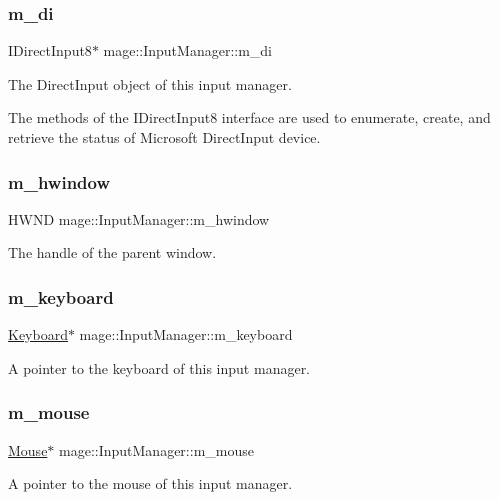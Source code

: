 \subsubsection{\texorpdfstring{m\+\_\+di}{m\_di}}
{\footnotesize\ttfamily I\+Direct\+Input8$\ast$ mage\+::\+Input\+Manager\+::m\+\_\+di\hspace{0.3cm}{\ttfamily [protected]}}

The Direct\+Input object of this input manager.

The methods of the I\+Direct\+Input8 interface are used to enumerate, create, and retrieve the status of Microsoft Direct\+Input device. \hypertarget{classmage_1_1_input_manager_a07a1d3a593bc497c747c6d2e4605a229}{}\label{classmage_1_1_input_manager_a07a1d3a593bc497c747c6d2e4605a229} 
\subsubsection{\texorpdfstring{m\+\_\+hwindow}{m\_hwindow}}
{\footnotesize\ttfamily H\+W\+ND mage\+::\+Input\+Manager\+::m\+\_\+hwindow\hspace{0.3cm}{\ttfamily [protected]}}

The handle of the parent window. \hypertarget{classmage_1_1_input_manager_a04251723b39860d1436295ca74d5e997}{}\label{classmage_1_1_input_manager_a04251723b39860d1436295ca74d5e997} 
\subsubsection{\texorpdfstring{m\+\_\+keyboard}{m\_keyboard}}
{\footnotesize\ttfamily \hyperlink{classmage_1_1_keyboard}{Keyboard}$\ast$ mage\+::\+Input\+Manager\+::m\+\_\+keyboard\hspace{0.3cm}{\ttfamily [protected]}}

A pointer to the keyboard of this input manager. \hypertarget{classmage_1_1_input_manager_a41f41c1c021cc6dae422cb9abe7b8f87}{}\label{classmage_1_1_input_manager_a41f41c1c021cc6dae422cb9abe7b8f87} 
\subsubsection{\texorpdfstring{m\+\_\+mouse}{m\_mouse}}
{\footnotesize\ttfamily \hyperlink{classmage_1_1_mouse}{Mouse}$\ast$ mage\+::\+Input\+Manager\+::m\+\_\+mouse\hspace{0.3cm}{\ttfamily [protected]}}

A pointer to the mouse of this input manager. 